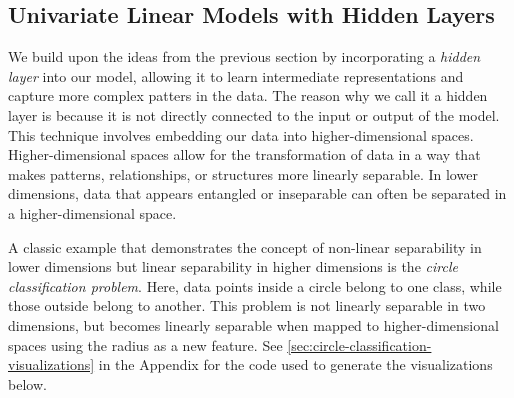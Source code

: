 \subsection{Univariate Linear Models with Hidden Layers}
We build upon the ideas from the previous section by incorporating a \emph{hidden layer} into our model, allowing it to learn intermediate representations and capture more complex patters in the data. The reason why we call it a hidden layer is because it is not directly connected to the input or output of the model. This technique involves embedding our data into higher-dimensional spaces. Higher-dimensional spaces allow for the transformation of data in a way that makes patterns, relationships, or structures more linearly separable. In lower dimensions, data that appears entangled or inseparable can often be separated in a higher-dimensional space. 

A classic example that demonstrates the concept of non-linear separability in lower dimensions but linear separability in higher dimensions is the \emph{circle classification problem}. Here, data points inside a circle belong to one class, while those outside belong to another. This problem is not linearly separable in two dimensions, but becomes linearly separable when mapped to higher-dimensional spaces using the radius as a new feature. See \ref{sec:circle-classification-visualizations} in the Appendix for the code used to generate the visualizations below.

